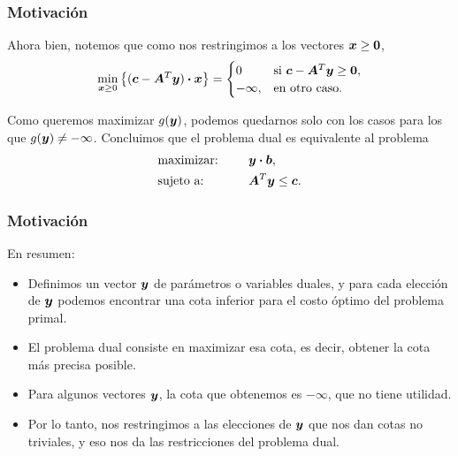 \documentclass[aspectratio=169,12pt,spanish]{beamer}
\begin{document}

\begin{frame}
\frametitle{Motivación}

Ahora bien, notemos que como nos restringimos a los vectores $\bm{x} \ge \bm{0}$,
$$\min_{\bm{x} \ge 0} \left\{ (\bm{c} - \bm{A}^T\bm{y}) \boldsymbol{\cdot} \bm{x} \right\} = \begin{cases}
0 & \text{si } \bm{c} - \bm{A}^T\bm{y} \ge \bm{0}, \\
-\infty, & \text{en otro caso.}\end{cases}
$$

Como queremos maximizar $g(\bm{y})$, podemos quedarnos solo con los casos para los que $g(\bm{y}) \neq -\infty$. Concluimos que el problema dual es equivalente al problema
\begin{alignat*}{2}
  & \text{maximizar: }  & \quad & \bm{y} \boldsymbol{\cdot} \bm{b},   \\
   & \text{sujeto a: }  &       & \bm{A}^T\bm{y} \le \bm{c}. \\
\end{alignat*}


\end{frame}


\begin{frame}
\frametitle{Motivación}

En resumen:
\begin{itemize}
\item Definimos un vector $\bm{y}$ de parámetros o variables duales, y para cada elección de $\bm{y}$ podemos encontrar una cota inferior para el costo óptimo del problema primal.
\item El problema dual consiste en maximizar esa cota, es decir, obtener la cota más precisa posible.
\item Para algunos vectores $\bm{y}$, la cota que obtenemos es $-\infty$, que no tiene utilidad.
\item Por lo tanto, nos restringimos a las elecciones de $\bm{y}$ que nos dan cotas no triviales, y eso nos da las restricciones del problema dual.
\end{itemize}

\end{frame}

\end{document}
